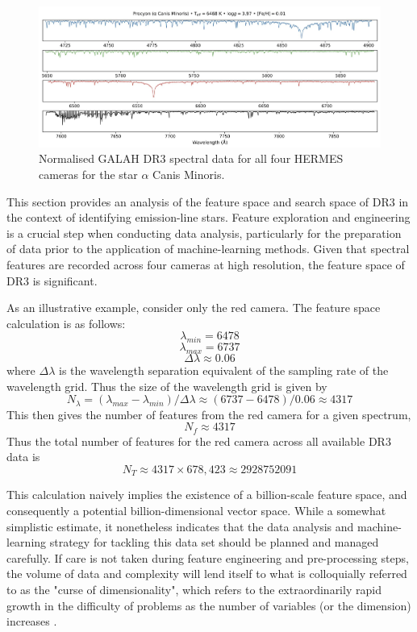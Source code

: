 \begin{figure}[!htb]
\centering
\includegraphics[scale=.25]{figures/galah cameras.jpeg}
\caption{Normalised GALAH DR3 spectral data for all four HERMES cameras for the star $\alpha$ Canis Minoris.}
\end{figure}

This section provides an analysis of the feature space and search space of DR3 in the context of identifying emission-line stars. Feature exploration and engineering is a crucial step when conducting data analysis, particularly for the preparation of data prior to the application of machine-learning methods. Given that spectral features are recorded across four cameras at high resolution, the feature space of DR3 is significant. 

As an illustrative example, consider only the red camera. The feature space calculation is as follows:
\[\lambda_{min} = 6478\]
\[\lambda_{max} = 6737\]
\[\Delta\lambda \approx 0.06\]
where $\Delta\lambda$ is the wavelength separation equivalent of the sampling rate of the wavelength grid. Thus the size of the wavelength grid is given by \[N_{\lambda} = (\lambda_{max}-\lambda_{min})/\Delta\lambda \approx (6737-6478)/0.06 \approx 4317\]
This then gives the number of features from the red camera for a given spectrum, \[N_{f} \approx 4317\]
Thus the total number of features for the red camera across all available DR3 data is \[N_{T} \approx 4317\times678,423 \approx \num[round-precision=2,round-mode=figures,
     scientific-notation=true]{2928752091}\]

This calculation naively implies the existence of a billion-scale feature space, and consequently a potential billion-dimensional vector space. While a somewhat simplistic estimate, it nonetheless indicates that the data analysis and machine-learning strategy for tackling this data set should be planned and managed carefully. If care is not taken during feature engineering and pre-processing steps, the volume of data and complexity will lend itself to what is colloquially referred to as the "curse of dimensionality", which refers to the extraordinarily rapid growth in the difficulty of problems as the number of variables (or the dimension) increases \citep{kuo2005lifting}.

